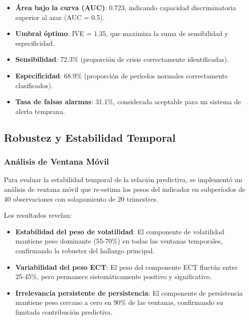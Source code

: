 \documentclass[3p,11pt]{elsarticle}
\begin{document}
\begin{itemize}
    \item \textbf{Área bajo la curva (AUC)}: 0.723, indicando capacidad discriminatoria superior al azar (AUC = 0.5).
    
    \item \textbf{Umbral óptimo}: IVE = 1.35, que maximiza la suma de sensibilidad y especificidad.
    
    \item \textbf{Sensibilidad}: 72.3\% (proporción de crisis correctamente identificadas).
    
    \item \textbf{Especificidad}: 68.9\% (proporción de períodos normales correctamente clasificados).
    
    \item \textbf{Tasa de falsas alarmas}: 31.1\%, considerada aceptable para un sistema de alerta temprana.
\end{itemize}

\subsection{Robustez y Estabilidad Temporal}

\subsubsection{Análisis de Ventana Móvil}

Para evaluar la estabilidad temporal de la relación predictiva, se implementó un análisis de ventana móvil que re-estima los pesos del indicador en subperíodos de 40 observaciones con solapamiento de 20 trimestres.

Los resultados revelan:

\begin{itemize}
    \item \textbf{Estabilidad del peso de volatilidad}: El componente de volatilidad mantiene peso dominante (55-70\%) en todas las ventanas temporales, confirmando la robustez del hallazgo principal.
    
    \item \textbf{Variabilidad del peso ECT}: El peso del componente ECT fluctúa entre 25-45\%, pero permanece sistemáticamente positivo y significativo.
    
    \item \textbf{Irrelevancia persistente de persistencia}: El componente de persistencia mantiene peso cercano a cero en 90\% de las ventanas, confirmando su limitada contribución predictiva.
\end{itemize}
\end{document}
